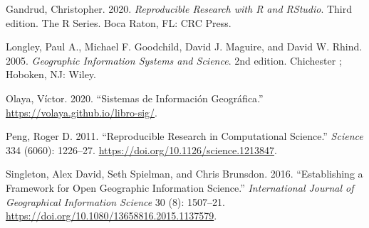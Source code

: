 \documentclass[
  letterpaper,
  DIV=11,
  numbers=noendperiod]{scrreprt}
\newlength{\cslhangindent}
\newlength{\cslentryspacingunit} %
\newenvironment{CSLReferences}[2] %
 {%
  \setlength{\parindent}{0pt}
  \ifodd #1
  \let\oldpar\par
  \def\par{\hangindent=\cslhangindent\oldpar}
  \fi
  \setlength{\parskip}{#2\cslentryspacingunit}
 }%
 {}
\begin{document}
\hypertarget{refs}{}
\begin{CSLReferences}{1}{0}
\leavevmode{}%
Gandrud, Christopher. 2020. \emph{Reproducible Research with {R} and
{RStudio}}. Third edition. The {R} Series. Boca Raton, FL: CRC Press.

\leavevmode{}%
Longley, Paul A., Michael F. Goodchild, David J. Maguire, and David W.
Rhind. 2005. \emph{Geographic {Information} {Systems} and {Science}}.
2nd edition. Chichester ; Hoboken, NJ: Wiley.

\leavevmode{}%
Olaya, Víctor. 2020. {``Sistemas de {Información} {Geográfica}.''}
\url{https://volaya.github.io/libro-sig/}.

\leavevmode{}%
Peng, Roger D. 2011. {``Reproducible {Research} in {Computational}
{Science}.''} \emph{Science} 334 (6060): 1226--27.
\url{https://doi.org/10.1126/science.1213847}.

\leavevmode{}%
Singleton, Alex David, Seth Spielman, and Chris Brunsdon. 2016.
{``Establishing a Framework for {Open} {Geographic} {Information}
Science.''} \emph{International Journal of Geographical Information
Science} 30 (8): 1507--21.
\url{https://doi.org/10.1080/13658816.2015.1137579}.

\end{CSLReferences}
\end{document}
